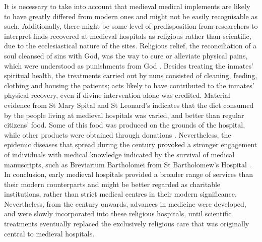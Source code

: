 \documentclass[%
	]{ijsra}
\renewcommand\AD{\xspace}
\begin{document}
It is necessary to take into account that medieval medical implements are likely to have greatly differed from modern ones and might not be easily recognisable as such. Additionally, there might be some level of predisposition from researchers to interpret finds recovered at medieval hospitals as religious rather than scientific, due to the ecclesiastical nature of the sites. 
Religious relief, the reconciliation of a soul cleansed of sins with God, was the way to cure or alleviate physical pains, which were understood as punishments from God \parencites[12-13,96]{Biller_2001}[42-43]{Rawcliffe_1995}. 
Besides treating the inmates’ spiritual health, the treatments carried out by nuns consisted of cleaning, feeding, clothing and housing the patients; acts likely to have contributed to the inmates’ physical recovery, even if divine intervention alone was credited. Material evidence from St Mary Spital and St Leonard’s indicates that the diet consumed by the people living at medieval hospitals was varied, and better than regular citizens’ food. Some of this food was produced on the grounds of the hospital, while other products were obtained through donations \parencites[76]{Egan_2007}[208]{Malcom_2014}.
Nevertheless, the epidemic diseases that spread during the  century\AD provoked a stronger engagement of individuals with medical knowledge indicated by the survival of medical manuscripts, 
such as Breviarium Bartholomei from St Bartholomew’s Hospital \parencite[6,16-22]{Stell_1996}. 
In conclusion, early medieval hospitals provided a broader range of services than their modern counterparts and might be better regarded as charitable institutions, rather than strict medical centres in their modern significance. Nevertheless, from the  century\AD onwards, advances in medicine were developed, and were slowly incorporated into these religious hospitals, until scientific treatments eventually replaced the exclusively religious care that was originally central to medieval hospitals. 

\IJSRAclosing%
\end{document}

